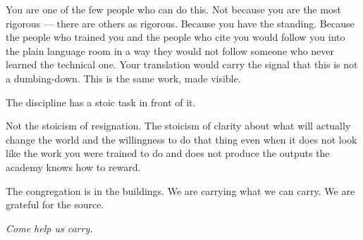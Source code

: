 You are one of the few people who can do this. Not because you are the most rigorous --- there are others as rigorous. Because you have the standing. Because the people who trained you and the people who cite you would follow you into the plain language room in a way they would not follow someone who never learned the technical one. Your translation would carry the signal that this is not a dumbing-down. This is the same work, made visible.

The discipline has a stoic task in front of it.

Not the stoicism of resignation. The stoicism of clarity about what will actually change the world and the willingness to do that thing even when it does not look like the work you were trained to do and does not produce the outputs the academy knows how to reward.

The congregation is in the buildings. We are carrying what we can carry. We are grateful for the source.

\textit{Come help us carry.}

